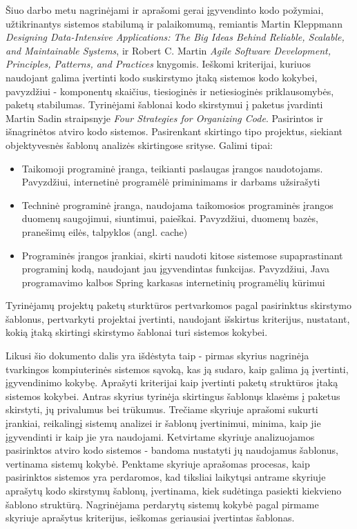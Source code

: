 Šiuo darbo metu nagrinėjami ir aprašomi gerai įgyvendinto kodo požymiai, užtikrinantys
sistemos stabilumą ir palaikomumą, remiantis Martin Kleppmann \textit{Designing Data-Intensive Applications: The Big Ideas Behind Reliable, Scalable, and Maintainable Systems},
ir Robert C. Martin \textit{Agile Software Development, Principles, Patterns, and Practices} knygomis.
Ieškomi kriterijai, kuriuos naudojant galima įvertinti kodo suskirstymo įtaką sistemos kodo kokybei, pavyzdžiui - komponentų skaičius, tiesioginės ir netiesioginės priklausomybės, paketų stabilumas\cite{AgileSoftwareDevelopment}.
Tyrinėjami šablonai kodo skirstymui į paketus įvardinti Martin Sadin straipsnyje \textit{Four Strategies for Organizing Code}.
Pasirintos ir išnagrinėtos atviro kodo sistemos.
Pasirenkant skirtingo tipo projektus, siekiant
objektyvesnės šablonų analizės skirtingose srityse.
Galimi tipai:
    \begin{itemize}
        \item Taikomoji programinė įranga, teikianti paslaugas įrangos naudotojams. Pavyzdžiui,
internetinė programėlė priminimams ir darbams užsirašyti
        \item Techninė programinė įranga, naudojama taikomosios programinės įrangos duomenų
saugojimui, siuntimui, paieškai. Pavyzdžiui, duomenų bazės, pranešimų eilės, talpyklos
(angl. cache)
        \item Programinės įrangos įrankiai, skirti naudoti kitose sistemose supaprastinant programinį
kodą, naudojant jau įgyvendintas funkcijas. Pavyzdžiui, Java programavimo kalbos
Spring karkasas internetinių programėlių kūrimui
    \end{itemize}
Tyrinėjamų projektų paketų sturktūros pertvarkomos pagal pasirinktus skirstymo šablonus, pertvarkyti projektai įvertinti, naudojant išskirtus kriterijus, nustatant, kokią įtaką
skirtingi skirstymo šablonai turi sistemos kokybei.

Likusi šio dokumento dalis yra išdėstyta taip - pirmas skyrius nagrinėja tvarkingos kompiuterinės sistemos sąvoką, kas ją sudaro, kaip galima ją įvertinti, įgyvendinimo kokybę.
Aprašyti kriterijai kaip įvertinti paketų struktūros įtaką sistemos kokybei.
Antras skyrius tyrinėja skirtingus šablonųs klasėms į paketus skirstyti, jų privalumus bei trūkumus.
Trečiame skyriuje aprašomi sukurti įrankiai, reikalingį sistemų analizei ir šablonų įvertinimui, minima, kaip jie įgyvendinti ir kaip jie yra naudojami.
Ketvirtame skyriuje analizuojamos pasirinktos atviro kodo sistemos - bandoma nustatyti jų naudojamus šablonus, vertinama sistemų kokybė.
Penktame skyriuje aprašomas procesas, kaip pasirinktos sistemos yra perdaromos, kad tiksliai laikytųsi antrame skyriuje aprašytų kodo skirstymų šablonų, įvertinama, kiek sudėtinga pasiekti kiekvieno šablono struktūrą.
Nagrinėjama perdarytų sistemų kokybė pagal pirmame skyriuje aprašytus kriterijus, ieškomas geriausiai įvertintas šablonas.
